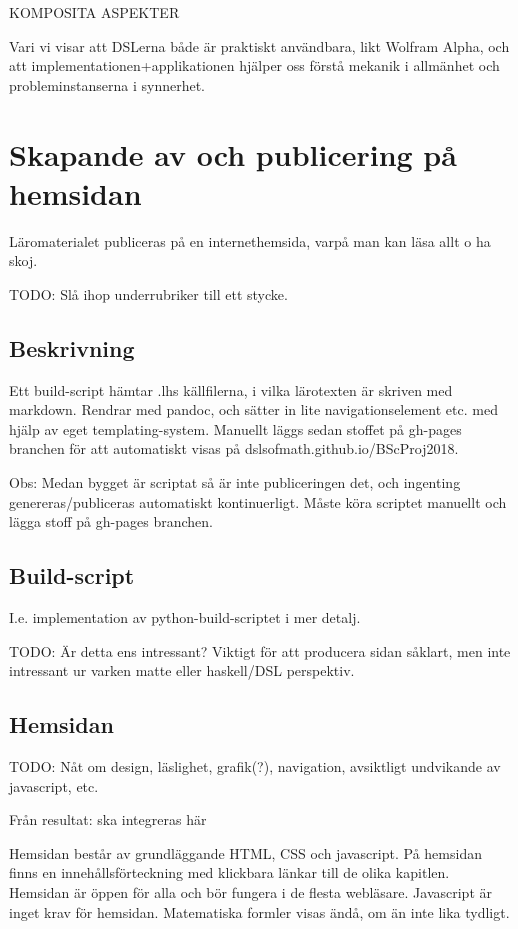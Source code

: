 \begin{binge}

KOMPOSITA ASPEKTER

Vari vi visar att DSLerna både är praktiskt användbara, likt Wolfram
Alpha, och att implementationen+applikationen hjälper oss förstå
mekanik i allmänhet och probleminstanserna i synnerhet.

\section{Skapande av och publicering på hemsidan}

  Läromaterialet publiceras på en internethemsida, varpå man kan läsa
  allt o ha skoj.

  TODO: Slå ihop underrubriker till ett stycke.

  \subsection{Beskrivning}

  Ett build-script hämtar .lhs källfilerna, i vilka lärotexten är
  skriven med markdown. Rendrar med pandoc, och sätter in lite
  navigationselement etc. med hjälp av eget templating-system. Manuellt
  läggs sedan stoffet på gh-pages branchen för att automatiskt visas på
  dslsofmath.github.io/BScProj2018. 

  Obs: Medan bygget är scriptat så är inte publiceringen det, och
  ingenting genereras/publiceras automatiskt kontinuerligt. Måste köra
  scriptet manuellt och lägga stoff på gh-pages branchen.

  \subsection{Build-script}

  I.e. implementation av python-build-scriptet i mer detalj.

  TODO: Är detta ens intressant? Viktigt för att producera sidan såklart, men
  inte intressant ur varken matte eller haskell/DSL perspektiv.

  \subsection{Hemsidan}

  TODO: Nåt om design, läslighet, grafik(?), navigation, avsiktligt undvikande
  av javascript, etc.

Från resultat: ska integreras här

Hemsidan består av grundläggande HTML, CSS och javascript. På hemsidan finns en innehållsförteckning med klickbara länkar till de olika kapitlen. Hemsidan är öppen för alla och bör fungera i de flesta webläsare. Javascript är inget krav för hemsidan. Matematiska formler visas ändå, om än inte lika tydligt.

\end{binge}
